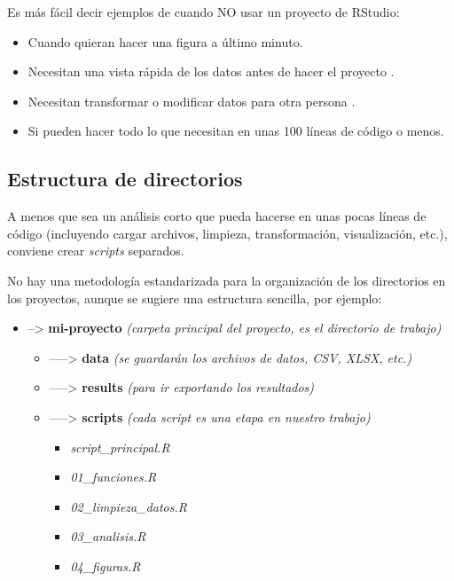 \documentclass[
]{book}
\providecommand{\tightlist}{%
  \setlength{\itemsep}{0pt}\setlength{\parskip}{0pt}}
\begin{document}
Es más fácil decir ejemplos de cuando NO usar un proyecto de RStudio:

\begin{itemize}
\item
  Cuando quieran hacer una figura a último minuto.
\item
  Necesitan una vista rápida de los datos antes de hacer el proyecto .
\item
  Necesitan transformar o modificar datos para otra persona .
\item
  Si pueden hacer todo lo que necesitan en unas 100 líneas de código o menos.
\end{itemize}

\hypertarget{estructura-de-directorios}{%
\subsection{Estructura de directorios}\label{estructura-de-directorios}}

A menos que sea un análisis corto que pueda hacerse en unas pocas líneas de código (incluyendo cargar archivos, limpieza, transformación, visualización, etc.), conviene crear \emph{scripts} separados.

No hay una metodología estandarizada para la organización de los directorios en los proyectos, aunque se sugiere una estructura sencilla, por ejemplo:

\begin{itemize}
\item
  --\textgreater{} \textbf{mi-proyecto} \emph{(carpeta principal del proyecto, es el directorio de trabajo)}

  \begin{itemize}
  \tightlist
  \item
    -----\textgreater{} \textbf{data} \emph{(se guardarán los archivos de datos, CSV, XLSX, etc.)}
  \item
    -----\textgreater{} \textbf{results} \emph{(para ir exportando los resultados)}
  \item
    -----\textgreater{} \textbf{scripts} \emph{(cada script es una etapa en nuestro trabajo)}

    \begin{itemize}
    \tightlist
    \item
      \emph{script\_principal.R}
    \item
      \emph{01\_funciones.R}
    \item
      \emph{02\_limpieza\_datos.R}
    \item
      \emph{03\_analisis.R}
    \item
      \emph{04\_figuras.R}
    \end{itemize}
  \end{itemize}
\end{itemize}
\end{document}
